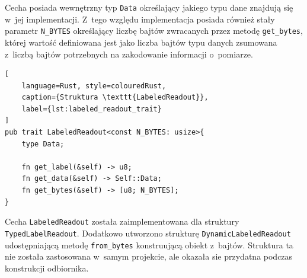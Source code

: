 Cecha posiada wewnętrzny typ \texttt{Data} określający 
jakiego typu dane znajdują się w~jej implementacji. 
Z~tego względu implementacja posiada również stały
parametr \texttt{N\_BYTES} określający liczbę bajtów
zwracanych przez metodę \texttt{get\_bytes}, której
wartość definiowana jest jako liczba bajtów typu
danych zsumowana z~liczbą bajtów potrzebnych
na zakodowanie informacji o~pomiarze.

\begin{lstlisting}[
    language=Rust, style=colouredRust, 
    caption={Struktura \texttt{LabeledReadout}},
    label={lst:labeled_readout_trait}
]
pub trait LabeledReadout<const N_BYTES: usize>{
    type Data;

    fn get_label(&self) -> u8;
    fn get_data(&self) -> Self::Data;
    fn get_bytes(&self) -> [u8; N_BYTES];
}
\end{lstlisting}

Cecha \texttt{LabeledReadout} została zaimplementowana 
dla struktury \texttt{TypedLabelReadout}. Dodatkowo 
utworzono strukturę \texttt{DynamicLabeledReadout}
udostępniającą metodę \texttt{from\_bytes} konstruującą
obiekt z~bajtów. Struktura ta nie została zastosowana
w~samym projekcie, ale okazała sie przydatna podczas
konstrukcji odbiornika.